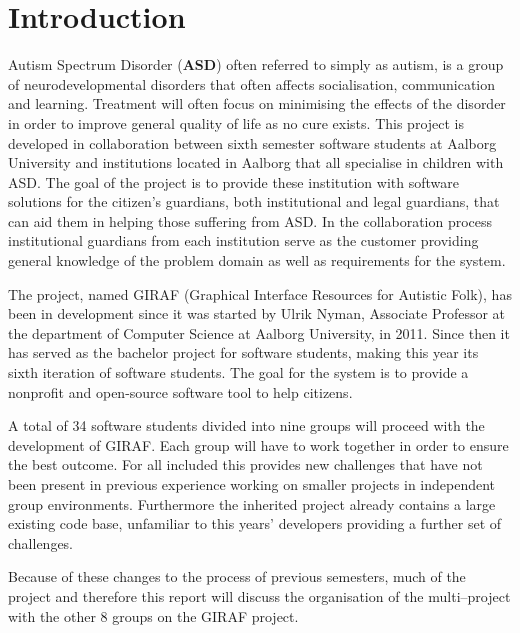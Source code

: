\chapter{Introduction}
Autism Spectrum Disorder (\textbf{ASD}) often referred to simply as autism, is a
group of neurodevelopmental disorders that often affects socialisation, communication and learning.
Treatment will often focus on minimising the effects of the disorder in order to improve general quality of life as no cure exists\citep{autism}.
This project is developed in collaboration between sixth semester software students at Aalborg University and institutions located in Aalborg that all specialise in children with ASD.
The goal of the project is to provide these institution with software solutions for the citizen's guardians, both institutional and legal guardians, that can aid them in helping those suffering from ASD.
In the collaboration process institutional guardians from each institution serve as the customer providing general knowledge of the problem domain as well as requirements for the system.

The project, named GIRAF (Graphical Interface Resources for Autistic Folk), has been in development since it was started by Ulrik Nyman, Associate Professor at the department of Computer Science at Aalborg University, in 2011.
Since then it has served as the bachelor project for software students, making this year its sixth iteration of software students.
The goal for the system is to provide a nonprofit and open-source software tool to help citizens.

A total of 34 software students divided into nine groups will proceed with the development of GIRAF.
Each group will have to work together in order to ensure the best outcome.
For all included this provides new challenges that have not been present in previous experience working on smaller projects in independent group environments.
Furthermore the inherited project already contains a large existing code base, unfamiliar to this years' developers providing a further set of challenges.

Because of these changes to the process of previous semesters, much of the project and therefore this report will discuss the organisation of the multi--project with the other 8 groups on the GIRAF project.
